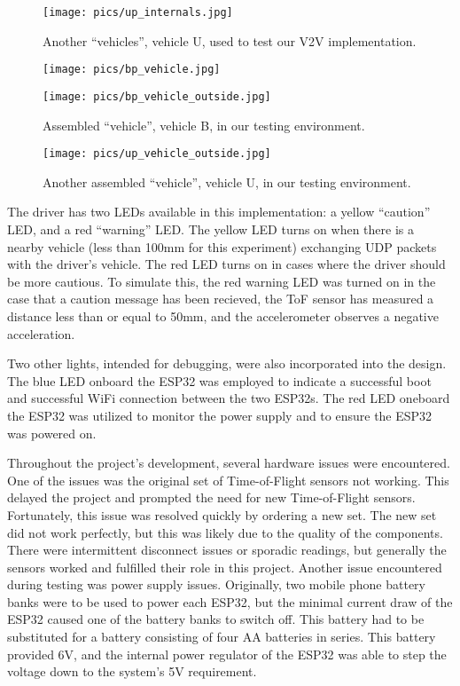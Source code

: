 \documentclass[conference]{IEEEtran}
\begin{document}
\begin{figure}[htbp]
\centerline{\texttt{[image: pics/up\_internals.jpg]}}
\caption{Another ``vehicles'', vehicle U, used to test our V2V implementation.}
\label{vehicle_up}
\end{figure}

\begin{figure}[htbp]
\centerline{\texttt{[image: pics/bp\_vehicle.jpg]}}
\centerline{\texttt{[image: pics/bp\_vehicle\_outside.jpg]}}
\caption{Assembled ``vehicle'', vehicle B, in our testing environment.}
\label{bp_outside}
\end{figure}

\begin{figure}[htbp]
\centerline{\texttt{[image: pics/up\_vehicle\_outside.jpg]}}
\caption{Another assembled ``vehicle'', vehicle U, in our testing environment.}
\label{up_outside}
\end{figure}

The driver has two LEDs available in this implementation: a yellow ``caution''
LED, and a red ``warning'' LED. The yellow LED turns on when there is a nearby vehicle
(less than 100mm for this experiment) exchanging UDP packets with the driver's vehicle.
The red LED turns on in cases where the driver should be more cautious. To simulate this,
the red warning LED was turned on in the case that a caution message has been recieved, 
the ToF sensor has measured a distance less than or equal to 50mm, and the accelerometer
observes a negative acceleration.

Two other lights, intended for debugging, were also incorporated into the design. The blue
LED onboard the ESP32 was employed to indicate a successful boot and successful WiFi
connection between the two ESP32s. The red LED oneboard the ESP32 was utilized to 
monitor the power supply and to ensure the ESP32 was powered on.

Throughout the project's development, several hardware issues were encountered.
One of the issues was the original set of Time-of-Flight sensors not working.
This delayed the project and prompted the need for new Time-of-Flight sensors.
Fortunately, this issue was resolved quickly by ordering a new set. The new set
did not work perfectly, but this was likely due to the quality of the components.
There were intermittent disconnect issues or sporadic readings, but generally
the sensors worked and fulfilled their role in this project. Another issue encountered
during testing was power supply issues. Originally, two mobile phone battery banks were
to be used to power each ESP32, but the minimal current draw of the ESP32 caused one
of the battery banks to switch off. This battery had to be substituted for a
battery consisting of four AA batteries in series. This battery provided 6V, and the
internal power regulator of the ESP32 was able to step the voltage down to the system's
5V requirement.
\end{document}
